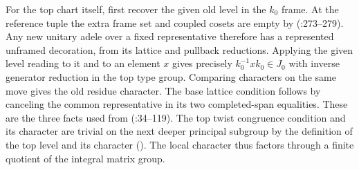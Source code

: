 For the top chart itself, first recover the given old level in the
$k_0$ frame. At the reference tuple the extra frame set and coupled
cosets are empty by 
(:273--279).
Any new unitary adele over a fixed representative
therefore has a represented unframed decoration, from its lattice
and pullback reductions. Applying the given level reading to it and
to an element $x$ gives precisely $k_0^{-1}xk_0\in J_0$ with inverse
generator reduction in the top type group. Comparing characters on
the same move gives the old residue character. The base lattice
condition follows by canceling the common representative in its two
completed-span equalities. These are the three facts used from
 (:34--119).
The top twist
congruence condition and its character are trivial on the next deeper
principal subgroup by the definition of the top level and its character
().
The local character thus factors through a finite quotient of the
integral matrix group.

